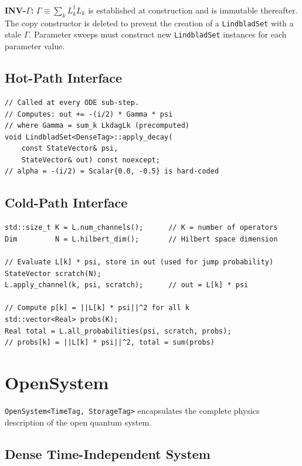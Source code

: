 \documentclass[11pt,a4paper,twoside]{book}
\newcommand{\code}[1]{\texttt{\small#1}}
\theoremstyle{definition}
\theoremstyle{remark}
\begin{document}
\begin{invbox}
  \textbf{INV-$\Gamma$:}
  $\Gamma \equiv \sum_k L_k^\dagger L_k$ is established at construction
  and is immutable thereafter. The copy constructor is deleted to
  prevent the creation of a \code{LindbladSet} with a stale
  $\Gamma$. Parameter sweeps must construct new \code{LindbladSet}
  instances for each parameter value.
\end{invbox}

\subsection{Hot-Path Interface}
\label{subsec:lindblad-hot}

\begin{verbatim}
// Called at every ODE sub-step.
// Computes: out += -(i/2) * Gamma * psi
// where Gamma = sum_k LkdagLk (precomputed)
void LindbladSet<DenseTag>::apply_decay(
    const StateVector& psi,
    StateVector& out) const noexcept;
// alpha = -(i/2) = Scalar{0.0, -0.5} is hard-coded
\end{verbatim}

\subsection{Cold-Path Interface}
\label{subsec:lindblad-cold}

\begin{verbatim}
std::size_t K = L.num_channels();      // K = number of operators
Dim         N = L.hilbert_dim();       // Hilbert space dimension

// Evaluate L[k] * psi, store in out (used for jump probability)
StateVector scratch(N);
L.apply_channel(k, psi, scratch);      // out = L[k] * psi

// Compute p[k] = ||L[k] * psi||^2 for all k
std::vector<Real> probs(K);
Real total = L.all_probabilities(psi, scratch, probs);
// probs[k] = ||L[k] * psi||^2, total = sum(probs)
\end{verbatim}

\section{OpenSystem}
\label{sec:opensystem}

\code{OpenSystem<TimeTag, StorageTag>} encapsulates the complete
physics description of the open quantum system.

\subsection{Dense Time-Independent System}
\label{subsec:opensystem-dense-ti}
\end{document}
